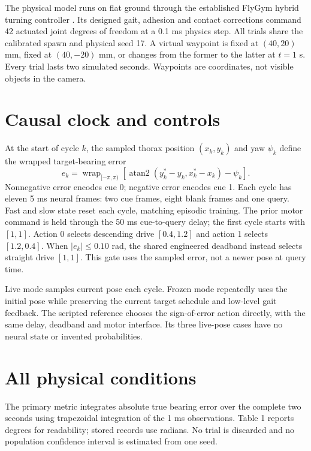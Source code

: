 \documentclass[10pt]{article}
\begin{document}
The physical model runs on flat ground through the established FlyGym hybrid
turning controller \cite{neuromechfly,flygymturning}. Its designed gait,
adhesion and contact corrections command 42 actuated joint degrees of freedom
at a 0.1 ms physics step. All trials share the calibrated spawn and physical
seed 17. A virtual waypoint is fixed at $(40,20)$ mm, fixed at $(40,-20)$ mm,
or changes from the former to the latter at $t=1$ s. Every trial lasts two
simulated seconds. Waypoints are coordinates, not visible objects in the camera.

\newpage
\section{Causal clock and controls}
At the start of cycle $k$, the sampled thorax position $(x_k,y_k)$ and yaw
$\psi_k$ define the wrapped target-bearing error
\begin{equation}
e_k=\operatorname{wrap}_{[-\pi,\pi)}\left[
\operatorname{atan2}(y^*_k-y_k,x^*_k-x_k)-\psi_k\right].
\end{equation}
Nonnegative error encodes cue 0; negative error encodes cue 1. Each cycle has
eleven 5 ms neural frames: two cue frames, eight blank frames and one query.
Fast and slow state reset each cycle, matching episodic training. The prior
motor command is held through the 50 ms cue-to-query delay; the first cycle
starts with $[1,1]$. Action 0 selects descending drive $[0.4,1.2]$ and action 1
selects $[1.2,0.4]$. When $|e_k|\leq0.10$ rad, the shared engineered deadband
instead selects straight drive $[1,1]$. This gate uses the sampled error,
not a newer pose at query time.

Live mode samples current pose each cycle. Frozen mode repeatedly uses the
initial pose while preserving the current target schedule and low-level gait
feedback. The scripted reference chooses the sign-of-error action directly,
with the same delay, deadband and motor interface. Its three live-pose cases
have no neural state or invented probabilities.

\section{All physical conditions}
The primary metric integrates absolute true bearing error over the complete
two seconds using trapezoidal integration of the 1 ms observations. Table 1
reports degrees for readability; stored records use radians. No trial is
discarded and no population confidence interval is estimated from one seed.
\end{document}

